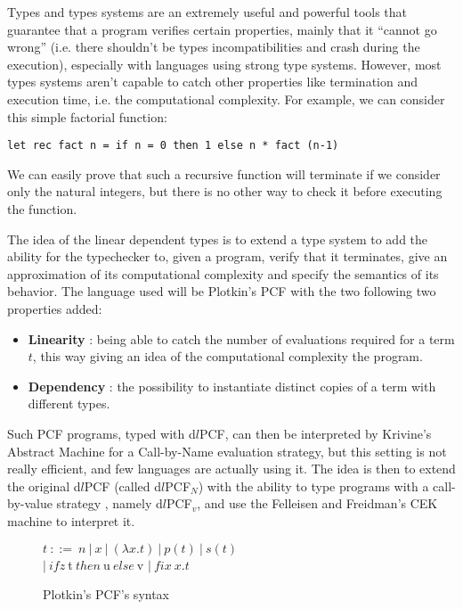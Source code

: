 \documentclass[a4paper,12pt]{article}
\begin{document}
Types and types systems are an extremely useful and powerful tools
that guarantee that a program verifies certain properties, mainly that
it ``cannot go wrong'' (i.e. there shouldn't be types
incompatibilities and crash during the execution), especially with
languages using strong type systems. However, most types systems
aren't capable to catch other properties like termination and
execution time, i.e. the computational complexity. For example, we can
consider this simple factorial function:

\begin{verbatim}
let rec fact n = if n = 0 then 1 else n * fact (n-1)
\end{verbatim}

We can easily prove that such a recursive function will terminate if we consider
only the natural integers, but there is no other way to check it before
executing the function.

The idea of the linear dependent types \cite{ldtrc} is to extend a type system
to add the ability for the typechecker to, given a program, verify that it
terminates, give an approximation of its computational complexity and specify
the semantics of its behavior. The language used will be Plotkin's
PCF with the two following two properties added:

\begin{itemize}
\item \textbf{Linearity} : being able to catch the number of evaluations required
  for a term $t$, this way giving an idea of the computational complexity the
  program.
\item \textbf{Dependency} : the possibility to instantiate distinct copies of a term with
  different types.
\end{itemize}

Such PCF programs, typed with d$l$PCF, can then be interpreted by Krivine's
Abstract Machine for a Call-by-Name evaluation strategy, but this setting is not
really efficient, and few languages are actually using it. The idea
is then to extend the original d$l$PCF (called d$l$PCF$_{N}$) with the ability to
type programs with a call-by-value strategy \cite{ldtcbv}, namely d$l$PCF$_{v}$,
and use the Felleisen and Freidman's CEK machine to interpret it.


\begin{figure}[ht]
  \begin{center}
    $t~::=~n~|~x~|~(\lambda x.t)~|~p(t)~|~s(t)$ \\
    $|~ifz~$t$~then~$u$~else~$v $|~fix~x.t$
  \end{center}
  \caption{Plotkin's PCF's syntax}
  \label{pcf-syntax}
\end{figure}
\end{document}
